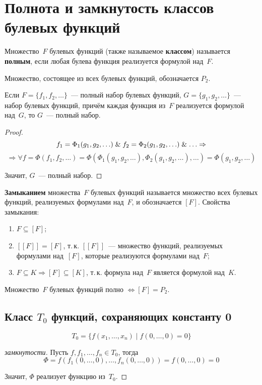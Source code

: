 \section{Полнота и замкнутость классов булевых функций}
Множество~$F$ булевых функций (также называемое \textbf{классом}) называется \textbf{полным}, если любая булева функция реализуется формулой над~$F$.

Множество, состоящее из всех булевых функций, обозначается $P_2$.

\begin{theorem}
Если $F = \{ f_1, f_2, \ldots \}$~--- полный набор булевых функций, $G = \{ g_1, g_2, \ldots \}$~--- набор булевых функций, причём каждая функция из~$F$ реализуется формулой над~$G$, то $G$~--- полный набор.
\end{theorem}
\begin{proof}
\begin{equation*}
f_1 = \Phi_1(g_1, g_2, \ldots) \mathrel{\&} f_2 = \Phi_2(g_1, g_2, \ldots) \mathrel{\&} \ldots \Rightarrow
\end{equation*}
\begin{equation*}
\Rightarrow \forall f = \Phi(f_1, f_2, \ldots) =
\Phi(\Phi_1(g_1, g_2, \ldots), \Phi_2(g_1, g_2, \ldots), \ldots) =
\Phi(g_1, g_2, \ldots)
\end{equation*}

Значит, $G$~--- полный набор.
\end{proof}

 \textbf{Замыканием} множества~$F$ булевых функций называется множество всех булевых функций, реализуемых формулами над~$F$, и обозначается $[F]$.
Свойства замыкания:
\begin{enumerate}
	\item $F \subseteq [F]$;
	\item $[[F]] = [F]$, т.\,к. $[[F]]$~--- множество функций, реализуемых формулами над~$[F]$, которые реализуются формулами над~$F$;
	\item $F \subseteq K \Rightarrow [F] \subseteq [K]$, т.\,к. формула над~$F$ является формулой над~$K$.
\end{enumerate}

\begin{statement}
Множество~$F$ булевых функций полно $\Leftrightarrow [F] = P_2$.
\end{statement}

\subsection{Класс \texorpdfstring{$T_0$}{} функций, сохраняющих константу 0}
\begin{equation*}
T_0 = \{ f(x_1, \ldots, x_n) \mid f(0, \ldots, 0) = 0 \}
\end{equation*}
\begin{proof}[замкнутости]
Пусть $f, f_1, \ldots, f_n \in T_0$, тогда
\begin{equation*}
\Phi =
f(f_1(0, \ldots, 0), \ldots, f_n(0, \ldots, 0)) =
f(0, \ldots, 0) = 0
\end{equation*}

Значит, $\Phi$ реализует функцию из~$T_0$.
\end{proof}

